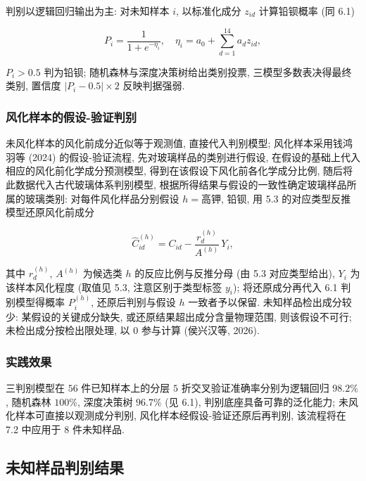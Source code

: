 \documentclass{ctexart}
\begin{document}
判别以逻辑回归输出为主: 对未知样本 $i$, 以标准化成分 $z_{id}$ 计算铅钡概率 (同 6.1)

\begin{equation*}
P_i=\frac{1}{1+e^{-\eta_i}},\quad\eta_{i}=a_{0}+\sum_{d=1}^{14}a_{d}z_{id},
\end{equation*}

$P_i>0.5$ 判为铅钡; 随机森林与深度决策树给出类别投票, 三模型多数表决得最终类别, 置信度 $\left|P_i-0.5\right|\times2$ 反映判据强弱.


\subsubsection{风化样本的假设-验证判别}

未风化样本的风化前成分近似等于观测值, 直接代入判别模型; 风化样本采用钱鸿羽等 (2024) 的假设-验证流程, 先对玻璃样品的类别进行假设, 在假设的基础上代入相应的风化前化学成分预测模型, 得到在该假设下风化前各化学成分比例, 随后将此数据代入古代玻璃体系判别模型, 根据所得结果与假设的一致性确定玻璃样品所属的玻璃类别: 对每件风化样品分别假设 $h=$高钾, 铅钡, 用 5.3 的对应类型反推模型还原风化前成分

\begin{equation*}
\widehat{C}_{id}^{\left(h\right)}=C_{id}-\frac{r_{d}^{\left(h\right)}}{A^{\left(h\right)}}\,Y_{i},
\end{equation*}

其中 $r_{d}^{\left(h\right)}$, $A^{\left(h\right)}$ 为候选类 $h$ 的反应比例与反推分母 (由 5.3 对应类型给出), $Y_i$ 为该样本风化程度 (取值见 5.3, 注意区别于类型标签 $y_i$); 将还原成分再代入 6.1 判别模型得概率 $P_i^{\left(h\right)}$, 还原后判别与假设 $h$ 一致者予以保留. 未知样品检出成分较少: 某假设的关键成分缺失, 或还原结果超出成分含量物理范围, 则该假设不可行; 未检出成分按检出限处理, 以 $0$ 参与计算 (侯兴汉等, 2026).

\subsubsection{实践效果}

三判别模型在 $56$ 件已知样本上的分层 $5$ 折交叉验证准确率分别为逻辑回归 $98.2\%$, 随机森林 $100\%$, 深度决策树 $96.7\%$ (见 6.1), 判别底座具备可靠的泛化能力; 未风化样本可直接以观测成分判别, 风化样本经假设-验证还原后再判别, 该流程将在 7.2 中应用于 $8$ 件未知样品.

\subsection{未知样品判别结果}
\end{document}
